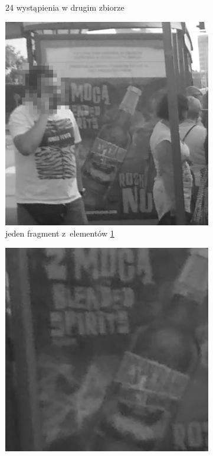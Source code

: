 \begin{figure}[h!]
\begin{subfigure}{.24\linewidth}
		\caption{24 wystąpienia w drugim zbiorze}
		\label{img:local5sessionsGroup}
	\end{subfigure}
	\hfill	
	\begin{subfigure}{.24\linewidth}\centering
		\centering
		\includegraphics[width=1\textwidth]{img/5sessions/02-wrong-03}
		\caption{jeden fragment z~elementów \ref{img:local5sessionsGroup}}
		\label{img:local5sessionsGroup2}
	\end{subfigure}
	\hfill	
	\begin{subfigure}{.24\linewidth}\centering
		\centering
		\includegraphics[width=1\textwidth]{img/5sessions/02-wrong-02}

\end{subfigure}
\end{figure}
